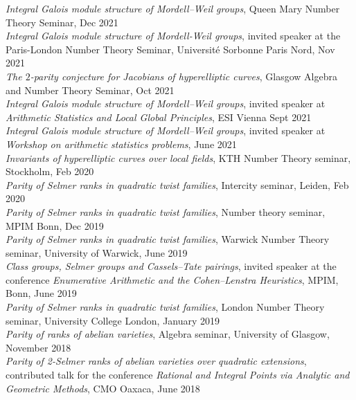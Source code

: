 \documentclass{res}
\begin{document}
\begin{resume}
{\it  Integral Galois module structure of Mordell--Weil groups}, Queen Mary Number Theory Seminar, Dec 2021   \medskip  \\
{\it  Integral Galois module structure of Mordell-Weil groups}, invited speaker at the Paris-London Number Theory Seminar, Université Sorbonne Paris Nord, Nov 2021  \medskip \\
{\it  The $2$-parity conjecture for Jacobians of hyperelliptic curves}, Glasgow Algebra and Number Theory Seminar, Oct 2021    \medskip  \\
{\it  Integral Galois module structure of Mordell--Weil groups}, invited speaker at {\it Arithmetic Statistics and Local Global Principles}, ESI Vienna Sept 2021    \medskip  \\
{\it  Integral Galois module structure of Mordell--Weil groups}, invited speaker at {\it Workshop on arithmetic statistics problems}, June 2021   \medskip  \\
{\it  Invariants of hyperelliptic curves over local fields}, KTH Number Theory seminar, Stockholm, Feb 2020  \vspace{-0.18in} \medskip  \\
{\it Parity of Selmer ranks in quadratic twist families}, Intercity seminar, Leiden, Feb 2020 \medskip \\
{\it Parity of Selmer ranks in quadratic twist families}, Number theory seminar, MPIM Bonn, Dec 2019 \medskip \\
{\it Parity of Selmer ranks in quadratic twist families}, Warwick Number Theory seminar, University of Warwick, June 2019 \medskip \\
{\it Class groups, Selmer groups and Cassels--Tate pairings}, invited speaker at the conference {\it Enumerative Arithmetic and the Cohen–Lenstra Heuristics}, MPIM, Bonn, June 2019 \medskip \\
{\it Parity of Selmer ranks in quadratic twist families}, London Number Theory seminar, University College London, January 2019  \medskip \\
{\it Parity of ranks of abelian varieties}, Algebra seminar, University of Glasgow, November 2018  \medskip \\
{\it Parity of 2-Selmer ranks of abelian varieties over quadratic extensions},  contributed talk for the conference {\it Rational and Integral Points via Analytic and Geometric Methods}, CMO Oaxaca, June 2018  \medskip \\

\end{resume}
\end{document}
